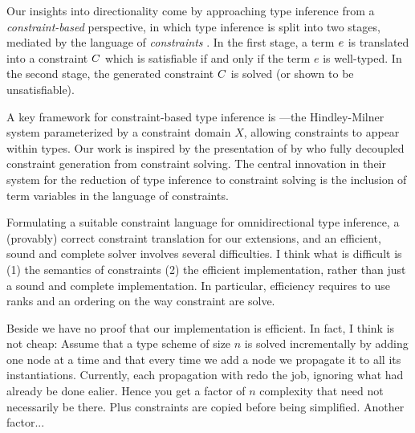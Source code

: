 \documentclass[acmsmall,screen,nonacm]{acmart}
\begin{document}

Our insights into directionality come by approaching type inference from a
\textit{constraint-based} \citep{TODO} perspective, in which type inference
is split into two stages, mediated by the language of \textit{constraints}
\citep{TODO}.  In the first stage, a term $e$ is translated into a constraint
$C$ which is satisfiable if and only if the term $e$ is well-typed. In the
second stage, the generated constraint $C$ is solved (or shown to be
unsatisfiable).


A key framework for constraint-based type inference is \HMX
\cite{Odersky-Sulzmann-Wehr@tpos}---the Hindley-Milner system parameterized
by a constraint domain $X$, allowing constraints to appear within types. Our
work is inspired by the presentation of \HMX by \citet{Pottier-Remy/emlti}
who fully decoupled constraint generation from constraint solving. The
central innovation in their system for the reduction of type inference to
constraint solving is the inclusion of term variables in the language of
constraints.

\begin{version}{}
Formulating a suitable constraint language for omnidirectional type
inference, a (provably) correct constraint translation for our extensions,
and an efficient, sound and complete solver involves several difficulties.
\Xdidier
{I think what is difficult is (1) the semantics of constraints (2) the
efficient implementation, rather than just a sound and complete
implementation. In particular, efficiency requires to use ranks and an
ordering on the way constraint are solve.}

\Xdidier
{Beside we have no proof that our implementation is efficient. In fact, I
think is not cheap: Assume that a type scheme of size $n$ is solved
incrementally by adding one node at a time and that every time we add a node
we propagate it to all its instantiations. Currently, each propagation with
redo the job, ignoring what had already be done ealier. Hence you get a
factor of $n$ complexity that need not necessarily be there. Plus
constraints are copied before being simplified. Another factor...}


\end{version}
\end{document}
